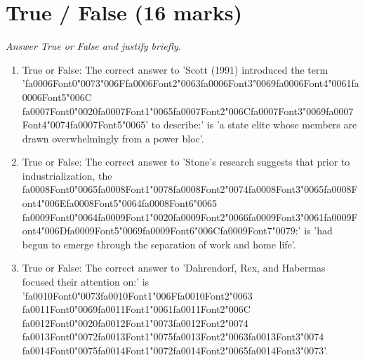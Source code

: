 \documentclass[12pt]{article}
\begin{document}
\section*{True / False (16 marks)}
\textit{Answer True or False and justify briefly.}
\begin{enumerate}[label=\arabic*.]
\item True or False: The correct answer to 'Scott (1991) introduced the term '{\csname fa0006Font0\endcsname\char"0073}{\char"006F}{\csname fa0006Font2\endcsname\char"0063}{\csname fa0006Font3\endcsname\char"0069}{\csname fa0006Font4\endcsname\char"0061}{\csname fa0006Font5\endcsname\char"006C} {\csname fa0007Font0\endcsname\char"0020}{\csname fa0007Font1\endcsname\char"0065}{\csname fa0007Font2\endcsname\char"006C}{\csname fa0007Font3\endcsname\char"0069}{\csname fa0007Font4\endcsname\char"0074}{\csname fa0007Font5\endcsname\char"0065}' to describe:' is 'a state elite whose members are drawn overwhelmingly from a power bloc'.
\item True or False: The correct answer to 'Stone's research suggests that prior to industrialization, the {\csname fa0008Font0\endcsname\char"0065}{\csname fa0008Font1\endcsname\char"0078}{\csname fa0008Font2\endcsname\char"0074}{\csname fa0008Font3\endcsname\char"0065}{\csname fa0008Font4\endcsname\char"006E}{\csname fa0008Font5\endcsname\char"0064}{\csname fa0008Font6\endcsname\char"0065} {\csname fa0009Font0\endcsname\char"0064}{\csname fa0009Font1\endcsname\char"0020}{\csname fa0009Font2\endcsname\char"0066}{\csname fa0009Font3\endcsname\char"0061}{\csname fa0009Font4\endcsname\char"006D}{\csname fa0009Font5\endcsname\char"0069}{\csname fa0009Font6\endcsname\char"006C}{\csname fa0009Font7\endcsname\char"0079}:' is 'had begun to emerge through the separation of work and home life'.
\item True or False: The correct answer to 'Dahrendorf, Rex, and Habermas focused their attention on:' is '{\csname fa0010Font0\endcsname\char"0073}{\csname fa0010Font1\endcsname\char"006F}{\csname fa0010Font2\endcsname\char"0063} {\csname fa0011Font0\endcsname\char"0069}{\csname fa0011Font1\endcsname\char"0061}{\csname fa0011Font2\endcsname\char"006C} {\csname fa0012Font0\endcsname\char"0020}{\csname fa0012Font1\endcsname\char"0073}{\csname fa0012Font2\endcsname\char"0074} {\csname fa0013Font0\endcsname\char"0072}{\csname fa0013Font1\endcsname\char"0075}{\csname fa0013Font2\endcsname\char"0063}{\csname fa0013Font3\endcsname\char"0074} {\csname fa0014Font0\endcsname\char"0075}{\csname fa0014Font1\endcsname\char"0072}{\csname fa0014Font2\endcsname\char"0065}{\csname fa0014Font3\endcsname\char"0073}'.

\end{enumerate}
\end{document}
